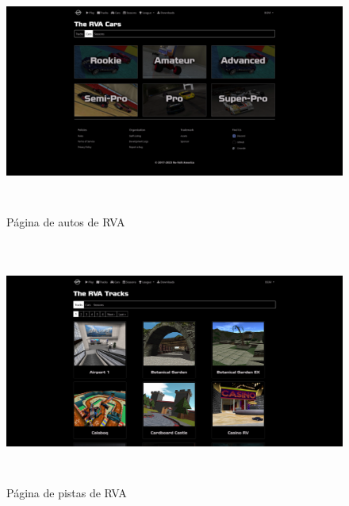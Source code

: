 \begin{figure}[H]
  \begin{center}
    \includegraphics[width=15cm, height=8cm]{img/cars.png} 
  \end{center}
  \caption[Página de autos de RVA]{Página de autos de RVA}
  \label{fig:cars}
\end{figure}

\begin{figure}[H]
  \begin{center}
    \includegraphics[width=15cm, height=8cm]{img/tracks.png} 
  \end{center}
  \caption[Página de pistas de RVA]{Página de pistas de RVA}
  \label{fig:tracks}
\end{figure}

